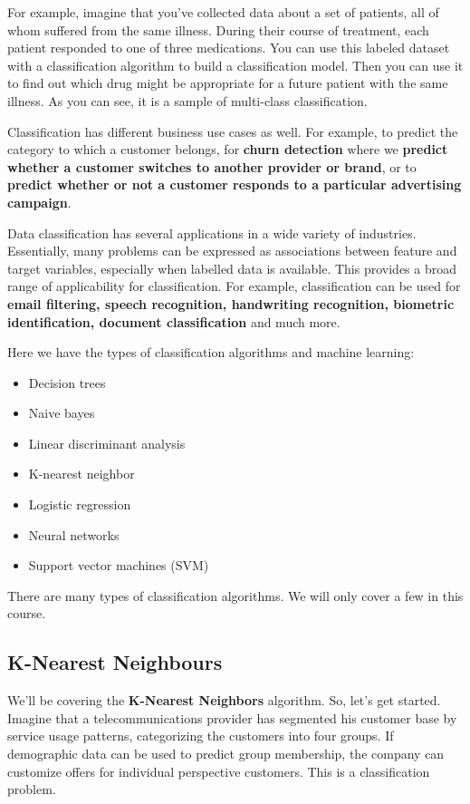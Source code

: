 	For example, imagine that you've collected data about a set of patients, all of whom suffered from the same illness. During their course of treatment, each patient responded to one of three medications. You can use this labeled dataset with a classification algorithm to build a classification model. Then you can use it to find out which drug might be appropriate for a future patient with the same illness. As you can see, it is a sample of multi-class classification. 
	
	Classification has different business use cases as well. For example, to predict the category to which a customer belongs, for \textbf{churn detection} where we \textbf{predict whether a customer switches to another provider or brand}, or to \textbf{predict whether or not a customer responds to a particular advertising campaign}. 
	
	Data classification has several applications in a wide variety of industries. Essentially, many problems can be expressed as associations between feature and target variables, especially when labelled data is available. This provides a broad range of applicability for classification. For example, classification can be used for \textbf{email filtering, speech recognition, handwriting recognition, biometric identification, document classification} and much more. 
	
	Here we have the types of classification algorithms and machine learning:
	
	\begin{itemize}
		\item Decision trees
		\item Naive bayes
		\item Linear discriminant analysis
		\item K-nearest neighbor
		\item Logistic regression
		\item Neural networks
		\item Support vector machines (SVM)
	\end{itemize} 

	 There are many types of classification algorithms. We will only cover a few in this course. 
	
	\subsection{K-Nearest Neighbours}	
	
	We'll be covering the \textbf{K-Nearest Neighbors} algorithm. So, let's get started. Imagine that a telecommunications provider has segmented his customer base by service usage patterns, categorizing the customers into four groups. If demographic data can be used to predict group membership, the company can customize offers for individual perspective customers. This is a classification problem. 
	
